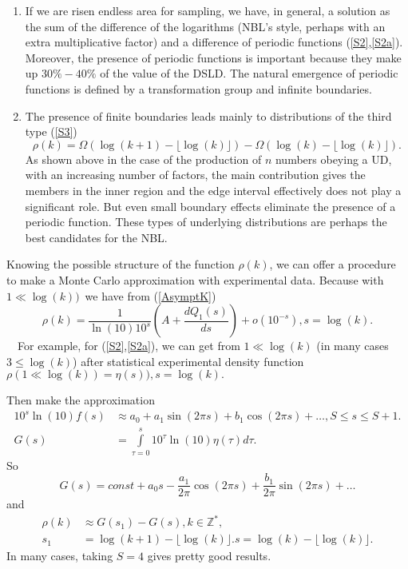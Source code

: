 \documentclass[titlepage,fleqn]{article}%
\providecommand{\U}[1]{\protect\rule{.1in}{.1in}}
\begin{document}
\begin{enumerate}
\item If we are risen endless area for sampling, we have, in general, a
solution as the sum of the difference of the logarithms (NBL's style, perhaps
with an extra multiplicative factor) and a difference of periodic functions
(\ref{S2},\ref{S2a}). Moreover, the presence of periodic functions is
important because they make up $30\%-40\%$ of the value of the DSLD. The
natural emergence of periodic functions is defined by a transformation group
and infinite boundaries.

\item The presence of finite boundaries leads mainly to distributions of the
third type (\ref{S3})%
\begin{equation}
\rho(k)=\Omega(\log(k+1)-\lfloor\log(k)\rfloor)-\Omega(\log(k)-\lfloor
\log(k)\rfloor).
\end{equation}
As shown above in the case of the production of $n$ numbers obeying a UD, with
an increasing number of factors, the main contribution gives the members in
the inner region and the edge interval effectively does not play a significant
role. But even small boundary effects eliminate the presence of a periodic
function. These types of underlying distributions are perhaps the best
candidates for the NBL.
\end{enumerate}

Knowing the possible structure of the function $\rho(k)$, we can offer a
procedure to make a Monte Carlo approximation with experimental data. Because
with $1\ll\log(k))$\ we have from (\ref{AsymptK})%
\[
\rho(k)=\frac{1}{\ln(10)10^{s}}\left(  A+\frac{dQ_{1}(s)}{ds}\right)
+o\left(  10^{-s}\right)  ,s=\log(k).
\]
\ \ For example, for (\ref{S2},\ref{S2a}), we can get from $1\ll\log(k)$ (in
many cases $3\leq\log(k)$) after statistical experimental density function
$\rho(1\ll\log(k))=\eta(s)),s=\log(k).$

Then make the approximation
\begin{align*}
10^{s}\ln(10)f(s) &  \approx a_{0}+a_{1}\sin(2\pi s)+b_{1}\cos(2\pi
s)+\ldots,S\leq s\leq S+1.\\
G(s) &  =%
{\displaystyle\int\limits_{\tau=0}^{s}}
10^{\tau}\ln(10)\eta(\tau)d\tau.
\end{align*}
So%
\[
G(s)=const+a_{0}s-\frac{a_{1}}{2\pi}\cos(2\pi s)+\frac{b_{1}}{2\pi}\sin(2\pi
s)+\ldots
\]
and%
\begin{align*}
\rho(k) &  \approx G(s_{1})-G(s),k\in%
\mathbb{Z}
^{\ast},\\
s_{1} &  =\log(k+1)-\lfloor\log(k)\rfloor.s=\log(k)-\lfloor\log(k)\rfloor.
\end{align*}
In many cases, taking $S=4$ gives pretty good results.
\end{document}
